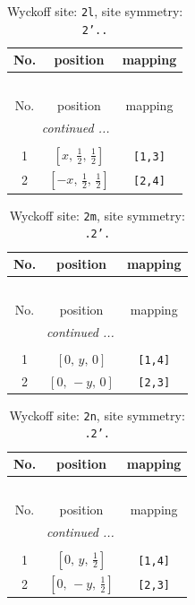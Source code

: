 \documentclass[fleqn,8pt]{jsarticle}
\begin{document}
\begin{longtable}{ccc}
\caption{Wyckoff site: {\tt 2l}, site symmetry: {\tt 2'..}}
 \\
 \hline \hline
No. & position & mapping \\ \hline \endfirsthead

\multicolumn{2}{l}{\tablename\ \thetable{}} \\
 \hline \hline
No. & position & mapping \\ \hline \endhead

 \hline \hline
\multicolumn{2}{r}{\footnotesize\it continued ...} \\ \endfoot

 \hline \hline
\multicolumn{2}{r}{} \\ \endlastfoot

1 & $\left[ x,\, \frac{1}{2},\, \frac{1}{2} \right]$ & {\tt [1,3]} \\ \hline
2 & $\left[ - x,\, \frac{1}{2},\, \frac{1}{2} \right]$ & {\tt [2,4]} \\
\end{longtable}
\renewcommand{\arraystretch}{1.2}
\begin{longtable}{ccc}
\caption{Wyckoff site: {\tt 2m}, site symmetry: {\tt .2'.}}
 \\
 \hline \hline
No. & position & mapping \\ \hline \endfirsthead

\multicolumn{2}{l}{\tablename\ \thetable{}} \\
 \hline \hline
No. & position & mapping \\ \hline \endhead

 \hline \hline
\multicolumn{2}{r}{\footnotesize\it continued ...} \\ \endfoot

 \hline \hline
\multicolumn{2}{r}{} \\ \endlastfoot

1 & $\left[ 0,\, y,\, 0 \right]$ & {\tt [1,4]} \\ \hline
2 & $\left[ 0,\, - y,\, 0 \right]$ & {\tt [2,3]} \\
\end{longtable}
\renewcommand{\arraystretch}{1.2}
\begin{longtable}{ccc}
\caption{Wyckoff site: {\tt 2n}, site symmetry: {\tt .2'.}}
 \\
 \hline \hline
No. & position & mapping \\ \hline \endfirsthead

\multicolumn{2}{l}{\tablename\ \thetable{}} \\
 \hline \hline
No. & position & mapping \\ \hline \endhead

 \hline \hline
\multicolumn{2}{r}{\footnotesize\it continued ...} \\ \endfoot

 \hline \hline
\multicolumn{2}{r}{} \\ \endlastfoot

1 & $\left[ 0,\, y,\, \frac{1}{2} \right]$ & {\tt [1,4]} \\ \hline
2 & $\left[ 0,\, - y,\, \frac{1}{2} \right]$ & {\tt [2,3]} \\
\end{longtable}
\end{document}
